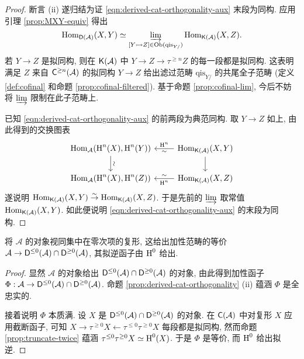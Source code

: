 \begin{proof}
	断言 (ii) 遂归结为证 \eqref{eqn:derived-cat-orthogonality-aux} 末段为同构. 应用引理 \ref{prop:MXY-equiv} 得出
	\[ \operatorname{Hom}_{\mathsf{D}(\mathcal{A})}(X, Y) \simeq \varinjlim_{[Y \rightarrowtail Z] \in \operatorname{Ob}(\mathrm{qis}_{Y/}) } \operatorname{Hom}_{\mathsf{K}(\mathcal{A})}(X, Z). \]
	若 $Y \to Z$ 是拟同构, 则在 $\mathsf{K}(\mathcal{A})$ 中 $Y \to Z \to \tau^{\geq n} Z$ 的每一段都是拟同构. 这表明满足 $Z$ 来自 $\mathsf{C}^{\geq n}(\mathcal{A})$ 的拟同构 $Y \to Z$ 给出滤过范畴 $\mathrm{qis}_{Y/}$ 的共尾全子范畴 (定义 \ref{def:cofinal} 和命题 \ref{prop:cofinal-filtered}). 基于命题 \ref{prop:cofinal-lim}, 今后不妨将 $\varinjlim$ 限制在此子范畴上.
	
	已知 \eqref{eqn:derived-cat-orthogonality-aux} 的前两段为典范同构. 取 $Y \to Z$ 如上, 由此得到的交换图表
	\[\begin{tikzcd}
		\Hom_{\mathcal{A}}(\Hm^n(X), \Hm^n(Y)) \arrow[d, "\sim" sloped] & \Hom_{\cate{K}(\mathcal{A})}(X, Y) \arrow[l, "\sim", "{\Hm^n}"'] \arrow[d] \\
		\Hom_{\mathcal{A}}(\Hm^n(X), \Hm^n(Z)) & \Hom_{\cate{K}(\mathcal{A})}(X, Z) \arrow[l, "\sim"', "{\Hm^n}"]
	\end{tikzcd}\]
	遂说明 $\operatorname{Hom}_{\mathsf{K}(\mathcal{A})}(X, Y) \stackrel{\sim}{\rightarrow} \operatorname{Hom}_{\mathsf{K}(\mathcal{A})}(X, Z)$. 于是先前的 $\varinjlim$ 取常值 $\operatorname{Hom}_{\mathsf{K}(\mathcal{A})}(X, Y)$. 如此便说明 \eqref{eqn:derived-cat-orthogonality-aux} 的末段为同构.
\end{proof}

\begin{theorem}\label{prop:derived-cat-embedding}
	将 $\mathcal{A}$ 的对象视同集中在零次项的复形, 这给出加性范畴的等价 $\mathcal{A} \to \mathsf{D}^{\leq 0}(\mathcal{A}) \cap \mathsf{D}^{\geq 0}(\mathcal{A})$, 其拟逆函子由 $\operatorname{H}^0$ 给出.
\end{theorem}
\begin{proof}
	显然 $\mathcal{A}$ 的对象给出 $\mathsf{D}^{\leq 0}(\mathcal{A}) \cap \mathsf{D}^{\geq 0}(\mathcal{A})$ 的对象, 由此得到加性函子 $\Phi: \mathcal{A} \to \mathsf{D}^{\leq 0}(\mathcal{A}) \cap \mathsf{D}^{\geq 0}(\mathcal{A})$. 命题 \ref{prop:derived-cat-orthogonality} (ii) 蕴涵 $\Phi$ 是全忠实的.

	接着说明 $\Phi$ 本质满. 设 $X$ 是 $\mathsf{D}^{\leq 0}(\mathcal{A}) \cap \mathsf{D}^{\geq 0}(\mathcal{A})$ 的对象. 在 $\mathsf{C}(\mathcal{A})$ 中对复形 $X$ 应用截断函子, 可知 $X \to \tau^{\geq 0} X \leftarrow \tau^{\leq 0} \tau^{\geq 0} X$ 每段都是拟同构, 然而命题 \ref{prop:truncate-twice} 蕴涵 $\tau^{\leq 0} \tau^{\geq 0} X \simeq \operatorname{H}^0(X)$. 于是 $\Phi$ 是等价, 而 $\operatorname{H}^0$ 给出拟逆.
\end{proof}

